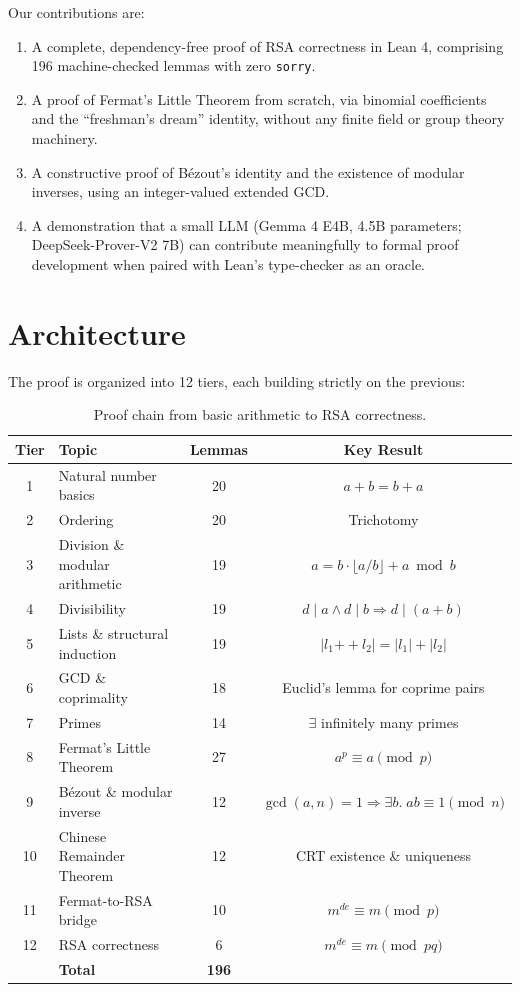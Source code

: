 \documentclass[11pt]{article}
\begin{document}
Our contributions are:
\begin{enumerate}[leftmargin=*]
    \item A complete, dependency-free proof of RSA correctness in Lean 4, comprising 196 machine-checked lemmas with zero \texttt{sorry}.
    \item A proof of Fermat's Little Theorem from scratch, via binomial coefficients and the ``freshman's dream'' identity, without any finite field or group theory machinery.
    \item A constructive proof of B\'{e}zout's identity and the existence of modular inverses, using an integer-valued extended GCD.
    \item A demonstration that a small LLM (Gemma 4 E4B, 4.5B parameters; DeepSeek-Prover-V2 7B) can contribute meaningfully to formal proof development when paired with Lean's type-checker as an oracle.
\end{enumerate}

\section{Architecture}

The proof is organized into 12 tiers, each building strictly on the previous:

\begin{table}[h]
\centering
\begin{tabular}{@{}clcc@{}}
\toprule
\textbf{Tier} & \textbf{Topic} & \textbf{Lemmas} & \textbf{Key Result} \\
\midrule
1  & Natural number basics     & 20 & $a + b = b + a$ \\
2  & Ordering                  & 20 & Trichotomy \\
3  & Division \& modular arithmetic & 19 & $a = b \cdot \lfloor a/b \rfloor + a \bmod b$ \\
4  & Divisibility              & 19 & $d \mid a \wedge d \mid b \Rightarrow d \mid (a+b)$ \\
5  & Lists \& structural induction & 19 & $|l_1 \mathbin{++} l_2| = |l_1| + |l_2|$ \\
6  & GCD \& coprimality        & 18 & Euclid's lemma for coprime pairs \\
7  & Primes                    & 14 & $\exists$ infinitely many primes \\
8  & Fermat's Little Theorem   & 27 & $a^p \equiv a \pmod{p}$ \\
9  & B\'{e}zout \& modular inverse & 12 & $\gcd(a,n)=1 \Rightarrow \exists b.\; ab \equiv 1 \pmod{n}$ \\
10 & Chinese Remainder Theorem & 12 & CRT existence \& uniqueness \\
11 & Fermat-to-RSA bridge      & 10 & $m^{de} \equiv m \pmod{p}$ \\
12 & RSA correctness           &  6 & $m^{de} \equiv m \pmod{pq}$ \\
\midrule
   & \textbf{Total}            & \textbf{196} & \\
\bottomrule
\end{tabular}
\caption{Proof chain from basic arithmetic to RSA correctness.}
\label{tab:tiers}
\end{table}
\end{document}

